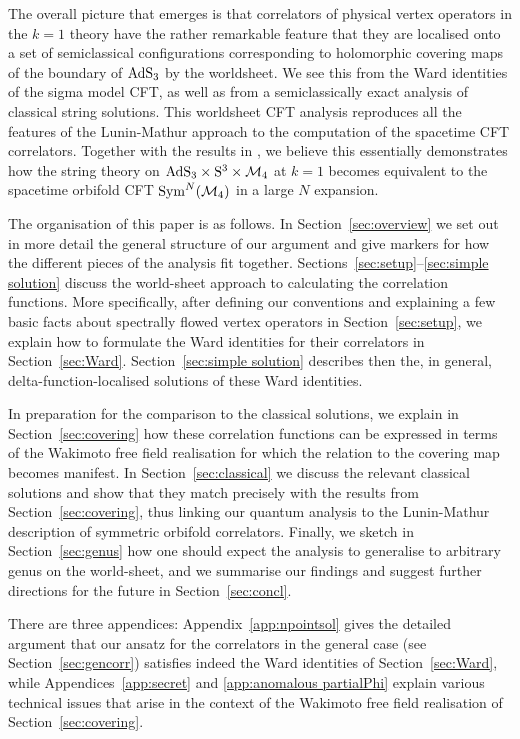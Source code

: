\documentclass[12pt,a4paper]{article}
\begin{document}
The overall picture that emerges is that correlators of physical vertex operators in the $k=1$ theory 
have the rather remarkable feature that they are localised onto a set of semiclassical configurations corresponding to holomorphic covering maps of the boundary of ${\rm AdS}_3$  by the worldsheet. 
We see this from the Ward identities of the sigma model CFT, as well as from a semiclassically exact analysis of classical string solutions. This worldsheet CFT analysis reproduces all the features of the Lunin-Mathur approach to the computation of the spacetime CFT correlators. Together with the results in 
\cite{Gaberdiel:2018rqv,Eberhardt:2018ouy}, we believe this essentially demonstrates how the string theory on  ${\rm AdS}_3\times {\rm S}^3\times {\cal M}_4$ at $k=1$ becomes equivalent to the spacetime orbifold CFT ${\rm Sym}^N({\cal M}_4)$ in a large $N$ expansion. 
    
\smallskip

The organisation of this paper is as follows. In Section~\ref{sec:overview} we set out in more detail the general structure of our argument and give markers for how the different pieces of the analysis fit together. Sections~\ref{sec:setup}--\ref{sec:simple solution} discuss the world-sheet approach to calculating the correlation functions. More specifically, after defining our conventions and explaining a few basic facts about spectrally flowed vertex operators in Section~\ref{sec:setup}, we explain how to formulate the Ward identities for their correlators in Section~\ref{sec:Ward}. Section~\ref{sec:simple solution} describes then the, in general, delta-function-localised solutions of these Ward identities.

In preparation for the comparison to the classical solutions, we explain in Section~\ref{sec:covering} how these correlation functions can be expressed in terms of the Wakimoto free field realisation for which the relation to the covering map becomes manifest. In Section~\ref{sec:classical} we discuss the relevant classical solutions and show that they match precisely with the results from Section~\ref{sec:covering}, thus linking our quantum analysis to the Lunin-Mathur description of symmetric orbifold correlators. Finally, we sketch in Section~\ref{sec:genus} how one should expect the analysis to generalise to arbitrary genus on the world-sheet, and we summarise our findings and suggest further directions for the future in Section~\ref{sec:concl}.

There are three appendices: Appendix~\ref{app:npointsol}  gives the detailed argument that our ansatz for the correlators in the general case (see Section~\ref{sec:gencorr}) satisfies indeed the Ward identities of Section~\ref{sec:Ward}, while Appendices~\ref{app:secret} and \ref{app:anomalous partialPhi} explain various  technical issues that arise in the context of the Wakimoto free field realisation of Section~\ref{sec:covering}. 
\end{document}
